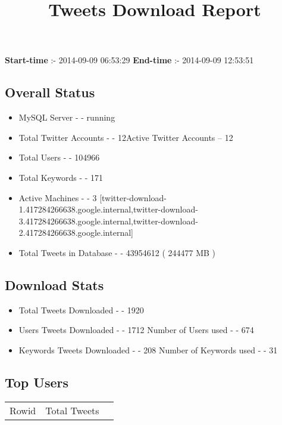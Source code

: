 \documentclass{article}\usepackage[T1]{fontenc}
\begin{document}
\title{\textbf{Tweets Download Report}}
               \date{}
                \maketitle
               \centerline{\textbf{Start-time} :- 2014-09-09 06:53:29 \hspace{40pt} \textbf{End-time} :- 2014-09-09 12:53:51}               \subsection*{Overall Status}                \begin{itemize}                \item MySQL Server - - running               \item Total Twitter Accounts - - 12\newline Active Twitter Accounts -- 12               \item Total Users - - 104966               \item Total Keywords - - 171               \item Active Machines - - 3 [twitter-download-1.417284266638.google.internal,twitter-download-3.417284266638.google.internal,twitter-download-2.417284266638.google.internal]               \item Total Tweets in Database - - 43954612 ( 244477 MB )               \end{itemize}               \subsection*{Download Stats}                \begin{itemize}                \item Total Tweets Downloaded - - 1920               \item Users Tweets Downloaded - - 1712 \newline Number of Users used - - 674               \item Keywords Tweets Downloaded - - 208 \newline Number of Keywords used - - 31              \end{itemize}              \subsection*{Top Users}\begin{tabular}{|c|c|c|}         \hline         Rowid & Total Tweets \\ 

\end{tabular}
\end{document}
